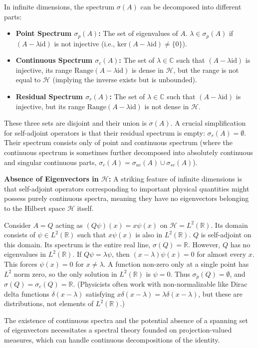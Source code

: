 In infinite dimensions, the spectrum $\sigma(A)$ can be decomposed into different parts:
\begin{itemize}
    \item \textbf{Point Spectrum $\sigma_p(A)$:} The set of eigenvalues of $A$. $\lambda \in \sigma_p(A)$ if $(A - \lambda \text{id})$ is not injective (i.e., $\text{ker}(A - \lambda \text{id}) \neq \{0\}$).
    \item \textbf{Continuous Spectrum $\sigma_c(A)$:} The set of $\lambda \in \mathbb{C}$ such that $(A - \lambda \text{id})$ is injective, its range $\text{Range}(A - \lambda \text{id})$ is dense in $\mathcal{H}$, but the range is not equal to $\mathcal{H}$ (implying the inverse exists but is unbounded).
    \item \textbf{Residual Spectrum $\sigma_r(A)$:} The set of $\lambda \in \mathbb{C}$ such that $(A - \lambda \text{id})$ is injective, but its range $\text{Range}(A - \lambda \text{id})$ is not dense in $\mathcal{H}$.
\end{itemize}
These three sets are disjoint and their union is $\sigma(A)$. A crucial simplification for self-adjoint operators is that their residual spectrum is empty: $\sigma_r(A) = \emptyset$. Their spectrum consists only of point and continuous spectrum (where the continuous spectrum is sometimes further decomposed into absolutely continuous and singular continuous parts, $\sigma_c(A) = \sigma_{ac}(A) \cup \sigma_{sc}(A)$).

\textbf{Absence of Eigenvectors in $\mathcal{H}$:}
A striking feature of infinite dimensions is that self-adjoint operators corresponding to important physical quantities might possess purely continuous spectra, meaning they have no eigenvectors belonging to the Hilbert space $\mathcal{H}$ itself.

\begin{example}
Consider $A = Q$ acting as $(Q\psi)(x) = x\psi(x)$ on $\mathcal{H} = L^2(\mathbb{R})$. Its domain consists of $\psi \in L^2(\mathbb{R})$ such that $x\psi(x)$ is also in $L^2(\mathbb{R})$. $Q$ is self-adjoint on this domain. Its spectrum is the entire real line, $\sigma(Q) = \mathbb{R}$. However, $Q$ has no eigenvalues in $L^2(\mathbb{R})$. If $Q\psi = \lambda \psi$, then $(x-\lambda)\psi(x) = 0$ for almost every $x$. This forces $\psi(x) = 0$ for $x \neq \lambda$. A function non-zero only at a single point has $L^2$ norm zero, so the only solution in $L^2(\mathbb{R})$ is $\psi=0$. Thus $\sigma_p(Q) = \emptyset$, and $\sigma(Q) = \sigma_c(Q) = \mathbb{R}$.
(Physicists often work with non-normalizable  like Dirac delta functions $\delta(x-\lambda)$ satisfying $x\delta(x-\lambda) = \lambda \delta(x-\lambda)$, but these are distributions, not elements of $L^2(\mathbb{R})$.)
\end{example}
The existence of continuous spectra and the potential absence of a spanning set of eigenvectors necessitates a spectral theory founded on projection-valued measures, which can handle continuous decompositions of the identity.

